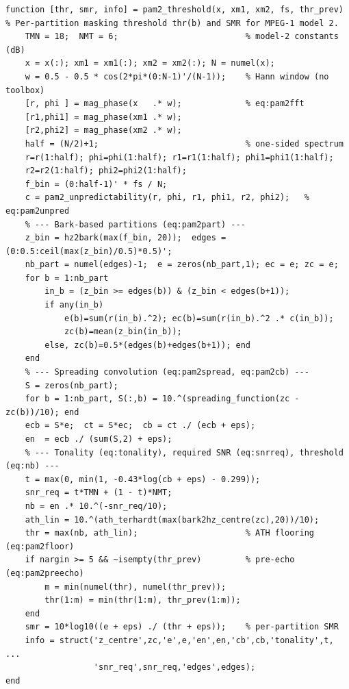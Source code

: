 \documentclass[11pt,a4paper]{article}
\begin{document}
\begin{lstlisting}[style=matlabstyle,caption={pam2\_threshold.m --- per-partition threshold and SMR (excerpt)},label={lst:pam2thr}]
function [thr, smr, info] = pam2_threshold(x, xm1, xm2, fs, thr_prev)
% Per-partition masking threshold thr(b) and SMR for MPEG-1 model 2.
    TMN = 18;  NMT = 6;                          % model-2 constants (dB)
    x = x(:); xm1 = xm1(:); xm2 = xm2(:); N = numel(x);
    w = 0.5 - 0.5 * cos(2*pi*(0:N-1)'/(N-1));    % Hann window (no toolbox)
    [r, phi ] = mag_phase(x   .* w);             % eq:pam2fft
    [r1,phi1] = mag_phase(xm1 .* w);
    [r2,phi2] = mag_phase(xm2 .* w);
    half = (N/2)+1;                              % one-sided spectrum
    r=r(1:half); phi=phi(1:half); r1=r1(1:half); phi1=phi1(1:half);
    r2=r2(1:half); phi2=phi2(1:half);
    f_bin = (0:half-1)' * fs / N;
    c = pam2_unpredictability(r, phi, r1, phi1, r2, phi2);   % eq:pam2unpred
    % --- Bark-based partitions (eq:pam2part) ---
    z_bin = hz2bark(max(f_bin, 20));  edges = (0:0.5:ceil(max(z_bin)/0.5)*0.5)';
    nb_part = numel(edges)-1;  e = zeros(nb_part,1); ec = e; zc = e;
    for b = 1:nb_part
        in_b = (z_bin >= edges(b)) & (z_bin < edges(b+1));
        if any(in_b)
            e(b)=sum(r(in_b).^2); ec(b)=sum(r(in_b).^2 .* c(in_b));
            zc(b)=mean(z_bin(in_b));
        else, zc(b)=0.5*(edges(b)+edges(b+1)); end
    end
    % --- Spreading convolution (eq:pam2spread, eq:pam2cb) ---
    S = zeros(nb_part);
    for b = 1:nb_part, S(:,b) = 10.^(spreading_function(zc - zc(b))/10); end
    ecb = S*e;  ct = S*ec;  cb = ct ./ (ecb + eps);
    en  = ecb ./ (sum(S,2) + eps);
    % --- Tonality (eq:tonality), required SNR (eq:snrreq), threshold (eq:nb) ---
    t = max(0, min(1, -0.43*log(cb + eps) - 0.299));
    snr_req = t*TMN + (1 - t)*NMT;
    nb = en .* 10.^(-snr_req/10);
    ath_lin = 10.^(ath_terhardt(max(bark2hz_centre(zc),20))/10);
    thr = max(nb, ath_lin);                      % ATH flooring (eq:pam2floor)
    if nargin >= 5 && ~isempty(thr_prev)         % pre-echo (eq:pam2preecho)
        m = min(numel(thr), numel(thr_prev));
        thr(1:m) = min(thr(1:m), thr_prev(1:m));
    end
    smr = 10*log10((e + eps) ./ (thr + eps));    % per-partition SMR
    info = struct('z_centre',zc,'e',e,'en',en,'cb',cb,'tonality',t, ...
                  'snr_req',snr_req,'edges',edges);
end
\end{lstlisting}
\end{document}
